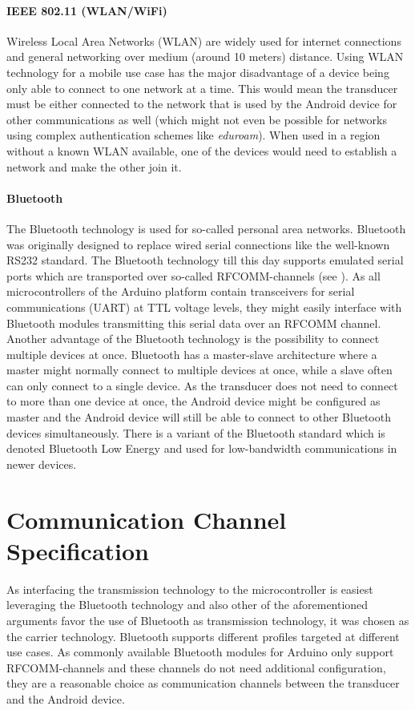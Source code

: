 \paragraph{IEEE 802.11 (WLAN/WiFi)}
Wireless Local Area Networks (WLAN) are widely used for internet connections and general networking over medium (around 10 meters) distance. Using WLAN technology for a mobile use case has the major disadvantage of a device being only able to connect to one network at a time. This would mean the transducer must be either connected to the network that is used by the Android device for other communications as well (which might not even be possible for networks using complex authentication schemes like \emph{eduroam}). When used in a region without a known WLAN available, one of the devices would need to establish a network and make the other join it. 

\paragraph{Bluetooth}
The Bluetooth technology is used for so-called personal area networks. Bluetooth was originally designed to replace wired serial connections like the well-known RS232 standard. The Bluetooth technology till this day supports emulated serial ports which are transported over so-called RFCOMM-channels (see \cite{RFCOMM}). As all microcontrollers of the Arduino platform contain transceivers for serial communications (UART) at TTL voltage levels, they might easily interface with Bluetooth modules transmitting this serial data over an RFCOMM channel. Another advantage of the Bluetooth technology is the possibility to connect multiple devices at once. Bluetooth has a master-slave architecture where a master might normally connect to multiple devices at once, while a slave often can only connect to a single device. As the transducer does not need to connect to more than one device at once, the Android device might be configured as master and the Android device will still be able to connect to other Bluetooth devices simultaneously. There is a variant of the Bluetooth standard which is denoted Bluetooth Low Energy and used for low-bandwidth communications in newer devices.

\section{Communication Channel Specification}
\label{sec:protocol}
As interfacing the transmission technology to the microcontroller is easiest leveraging the Bluetooth technology and also other of the aforementioned arguments favor the use of Bluetooth as transmission technology, it was chosen as the carrier technology. Bluetooth supports different profiles targeted at different use cases. As commonly available Bluetooth modules for Arduino only support RFCOMM-channels and these channels do not need additional configuration, they are a reasonable choice as communication channels between the transducer and the Android device.

